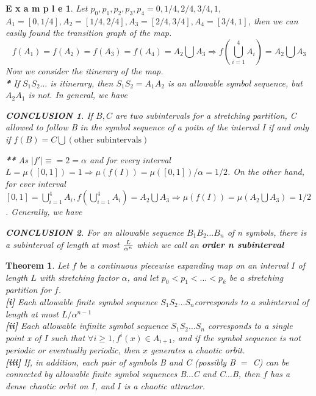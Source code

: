 \documentclass[12pt]{article}
\theoremstyle{plain}
\newtheorem{theorem}{\textbf{Theorem}}[section]
\newtheorem{example}{\textbf{E x a m p l e}}[section]
\newtheorem{conclusion}{\textit{\textbf{CONCLUSION}}}[section]
\begin{document}
\begin{example}
Let $p_0, p_1, p_2, p_3, p_4 = 0, 1/4, 2/4, 3/4, 1$, $A_1 = [0, 1/4], A_2 = [1/4, 2/4], A_3 = [2/4, 3/4], A_4 = [3/4, 1]$, then we can easily found the transition graph of the map.
$$
f(A_1) = f(A_2) = f(A_3) = f(A_4) = A_2 \bigcup A_3 \Rightarrow f\left(\bigcup_{i = 1}^{4}A_i\right) = A_2\bigcup A_3
$$
Now we consider the itinerary of the map.
\\\noindent \textbf{*} If $S_1S_2\ldots$ is itinerary, then $S_1S_2 = A_1A_2$ is an allowable symbol sequence, but $A_2A_1$ is not. In general, we have 
\begin{conclusion} If $B, C$ are two subintervals for a stretching partition, C allowed to follow B in the symbol sequence of a poitn of the interval I if and only if $f(B) = C \bigcup (\text{other subintervals})$
\end{conclusion}

  \noindent \textbf{**} As $|f'| \equiv = 2 = \alpha$ and for every interval $L = \mu([0, 1]) = 1 \Rightarrow \mu(f(I)) = \mu([0, 1])/\alpha = 1/2$. On the other hand, for ever interval $[0, 1] = \bigcup_{i = 1}^{4}A_i, f(\bigcup_{i = 1}^{4}A_i) = A_2 \bigcup A_3 \Rightarrow \mu(f(I)) = \mu(A_2\bigcup A_3) = 1/2$. Generally, we have 
\begin{conclusion} For an allowable sequence $B_1B_2\ldots B_n$ of n symbols, there is a subinterval of length at most $L \over \alpha^n$ which we call an \textbf{order n subinterval}
\end{conclusion}

\end{example}



\begin{theorem}Let $f$ be a continuous piecewise expanding map on an interval $I$ of length $L$ with stretching factor $\alpha$, and let $p_0 < p_1 < \ldots < p_k$ be a stretching partition for $f$.
\\\noindent \textbf{[i]} Each allowable finite symbol sequence $S_1S_2\ldots S_n$corresponds to a subinterval of length at most $L / \alpha^{n-1}$
\\\noindent \textbf{[ii]} Each allowable infinite symbol sequence $S_1S_2\ldots S_n$ corresponds to a single point x of $I$ such that $\forall i \geq 1, f^i(x) \in A_{i+1}$, and if the symbol sequence is not periodic or eventually periodic, then $x$ generates a chaotic orbit.
\\\noindent \textbf{[iii]} If, in addition, each pair of symbols B and C (possibly B $=$ C) can be connected by allowable finite symbol sequences B$\ldots$C and C$\ldots$B, then $f$ has a dense chaotic orbit on $I$, and $I$ is a chaotic attractor.
\end{theorem}
\end{document}
